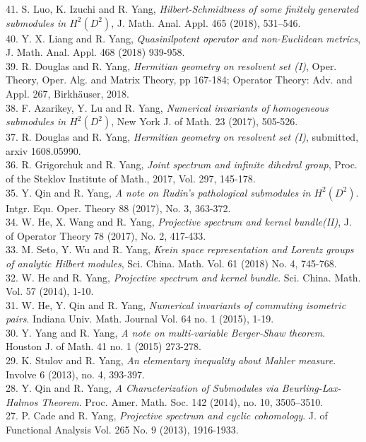 \documentclass[12pt]{res} %
\begin{document}
\begin{resume}
41. S. Luo, K. Izuchi and {R. Yang}, {\em Hilbert-Schmidtness of some finitely generated submodules in $H^2(D^2)$}, J. Math. Anal. Appl. 465 (2018), 531–546.\\
40. Y. X. Liang and  {R. Yang}, {\em Quasinilpotent operator and non-Euclidean metrics}, J. Math. Anal. Appl. {468} (2018) 939-958.\\
39. R. Douglas and {R. Yang}, {\em Hermitian geometry on resolvent set (I)}, Oper. Theory, Oper. Alg. and Matrix Theory, pp 167-184; Operator Theory: Adv. and Appl. { 267}, Birkh\"{a}user, 2018. \\
38. { F. Azarikey}, Y. Lu and R. Yang, {\em Numerical invariants of homogeneous submodules in $H^2(D^2)$}, New York J. of Math. 23 (2017), 505-526.\\
37. R. Douglas and {R. Yang}, {\em Hermitian geometry on resolvent set (I)}, submitted, arxiv 1608.05990.\\
36. R. Grigorchuk and {R. Yang}, {\em Joint spectrum and infinite dihedral group},  Proc. of the Steklov Institute of Math., 2017, Vol. 297, 145-178.\\
35. {Y. Qin} and R. Yang, {\em A note on Rudin's pathological submodules in $H^2(D^2)$}. Intgr. Equ. Oper. Theory 88 (2017), No. 3, 363-372.\\
34. {W. He}, X. Wang and R. Yang, {\em Projective spectrum and kernel bundle(II)}, J. of Operator Theory 78 (2017), No. 2, 417-433.\\
33. M. Seto, {Y. Wu} and R. Yang, {\em Krein space representation and Lorentz groups of analytic Hilbert modules}, Sci. China. Math. Vol. 61 (2018) No. 4, 745-768.\\
32. {W. He} and R. Yang, {\em Projective spectrum and kernel bundle}. Sci. China. Math. Vol. 57 (2014), 1-10.\\
31. {W. He}, Y. Qin and R. Yang, {\em Numerical invariants of commuting isometric pairs}.  Indiana Univ. Math. Journal Vol. 64 no. 1 (2015), 1-19.\\
30. {Y. Yang} and R. Yang, {\em A note on multi-variable Berger-Shaw theorem}. Houston J. of Math. 41 no. 1 (2015) 273-278.\\ 
29. K. Stulov and {R. Yang}, {\em An elementary inequality about Mahler measure}. Involve 6 (2013), no. 4, 393-397.\\
28. {Y. Qin} and R. Yang, {\em A Characterization of Submodules via Beurling-Lax-Halmos Theorem}. Proc. Amer. Math. Soc. 142 (2014), no. 10, 3505–3510.\\
27. P. Cade and {R. Yang}, {\em Projective spectrum and cyclic cohomology}. J. of Functional Analysis Vol. 265 No. 9 (2013), 1916-1933.\\

\end{resume}
\end{document}
